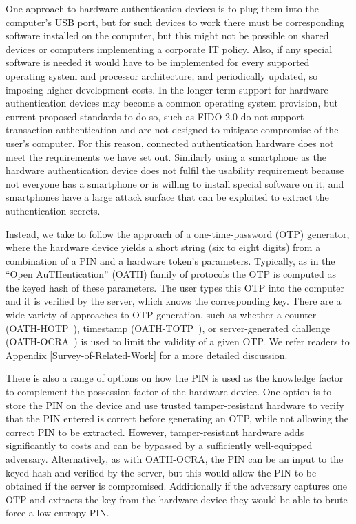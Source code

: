 One approach to hardware authentication devices is to plug them into the computer's USB port, but for such devices to work there must be corresponding software installed on the computer, but this might not be possible on shared devices or computers implementing a corporate IT policy.
Also, if any special software is needed it would have to be implemented for every supported operating system and processor architecture, and periodically updated, so imposing higher development costs.
In the longer term support for hardware authentication devices may become a common operating system provision, but current proposed standards to do so, such as FIDO 2.0 do not support transaction authentication and are not designed to mitigate compromise of the user's computer.
For this reason, connected authentication hardware does not meet the requirements we have set out.
Similarly using a smartphone as the hardware authentication device does not fulfil the usability requirement because not everyone has a smartphone or is willing to install special software on it, and smartphones have a large attack surface that can be exploited to extract the authentication secrets.

Instead, we take to follow the approach of a one-time-password (OTP) generator, where the hardware device yields a short string (\eg six to eight digits) from a combination of a PIN and a hardware token's parameters. Typically, as in the ``Open AuTHentication'' (OATH) family of protocols the OTP is computed as the keyed hash of these parameters. The user types this OTP into the computer and it is verified by the server, which knows the corresponding key. There are a wide variety of approaches to OTP generation, such as whether a counter (\eg OATH-HOTP~\cite{oath-hotp}), timestamp (\eg OATH-TOTP~\cite{oath-totp}), or server-generated challenge (\eg OATH-OCRA~\cite{oath-ocra}) is used to limit the validity of a given OTP.  We refer readers to Appendix \ref{Survey-of-Related-Work} for a more detailed discussion.

There is also a range of options on how the PIN is used as the knowledge factor to complement the possession factor of the hardware device.
One option is to store the PIN on the device and use trusted tamper-resistant hardware to verify that the PIN entered is correct before generating an OTP, while not allowing the correct PIN to be extracted.
However, tamper-resistant hardware adds significantly to costs and can be bypassed by a sufficiently well-equipped adversary.
Alternatively, as with OATH-OCRA, the PIN can be an input to the keyed hash and verified by the server, but this would allow the PIN to be obtained if the server is compromised.
Additionally if the adversary captures one OTP and extracts the key from the hardware device they would be able to brute-force a low-entropy PIN.

